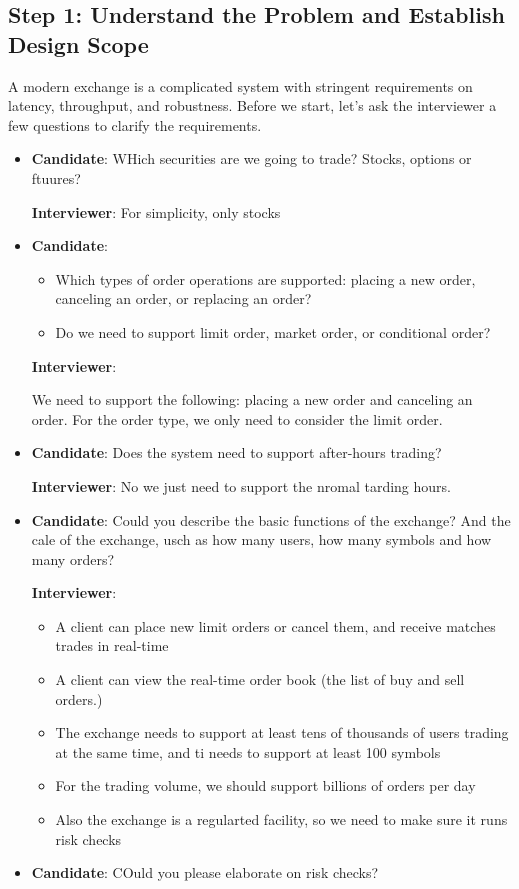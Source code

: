 \documentclass{report}
\theoremstyle{definition}
\let\oldsubsection\subsection
\renewcommand{\subsection}{\oldsubsection*}
\begin{document}
\subsection{Step 1: Understand the Problem and Establish Design Scope}

A modern exchange is a complicated system with stringent requirements on latency, throughput, and robustness. Before we start, let's ask the interviewer a few questions to clarify the requirements.

\begin{itemize}
\item

\textbf{Candidate}: WHich securities are we going to trade? Stocks, options or ftuures?

\textbf{Interviewer}: For simplicity, only stocks
\item
\textbf{Candidate}:

\begin{itemize}
\item
Which types of order operations are supported: placing a new order, canceling an order, or replacing an order?
\item
Do we need to support limit order, market order, or conditional order?
\end{itemize}

\textbf{Interviewer}:

We need to support the following: placing a new order and canceling an order. For the order type, we only need to consider the limit order.

\item
\textbf{Candidate}: Does the system need to support after-hours trading?

\textbf{Interviewer}: No we just need to support the nromal tarding hours.
\item
\textbf{Candidate}: Could you describe the basic functions of the exchange? And the cale of the exchange, usch as how many users, how many symbols and how many orders?

\textbf{Interviewer}:

\begin{itemize}
\item
A client can place new limit orders or cancel them, and receive matches trades in real-time
\item
A client can view the real-time order book (the list of buy and sell orders.)
\item
The exchange needs to support at least tens of thousands of users trading at the same time, and ti needs to support at least 100 symbols
\item
For the trading volume, we should support billions of orders per day
\item
Also the exchange is a regularted facility, so we need to make sure it runs risk checks
\end{itemize}
\item
\textbf{Candidate}: COuld you please elaborate on risk checks?


\end{itemize}
\end{document}

